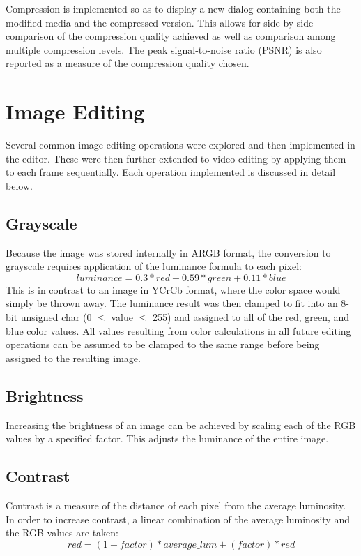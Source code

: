 \documentclass[10pt,twocolumn,twoside]{IEEEtran}
\begin{document}
Compression is implemented so as to display a new dialog containing both the modified media and the compressed version. This allows for side-by-side comparison of the compression quality achieved as well as comparison among multiple compression levels. The peak signal-to-noise ratio (PSNR) is also reported as a measure of the compression quality chosen. 

\section{Image Editing}
Several common image editing operations were explored and then implemented in the editor. These were then further extended to video editing by applying them to each frame sequentially. Each operation implemented is discussed in detail below.

\subsection{Grayscale}
Because the image was stored internally in ARGB format, the conversion to grayscale requires application of the luminance formula to each pixel: \begin{equation*}luminance = 0.3*red + 0.59*green + 0.11*blue \end{equation*}
This is in contrast to an image in YCrCb format, where the color space would simply be thrown away. The luminance result was then clamped to fit into an 8-bit unsigned char (0 $\leq$ value $\leq$ 255) and assigned to all of the red, green, and blue color values. All values resulting from color calculations in all future editing operations can be assumed to be clamped to the same range before being assigned to the resulting image. 

\subsection{Brightness}
Increasing the brightness of an image can be achieved by scaling each of the RGB values by a specified factor. This adjusts the luminance of the entire image.

\subsection{Contrast}
Contrast is a measure of the distance of each pixel from the average luminosity. In order to increase contrast,  a linear combination of the average luminosity and the RGB values are taken:
\begin{equation*} red = (1 - factor)*average\_lum + (factor)*red \end{equation*}
\end{document}
